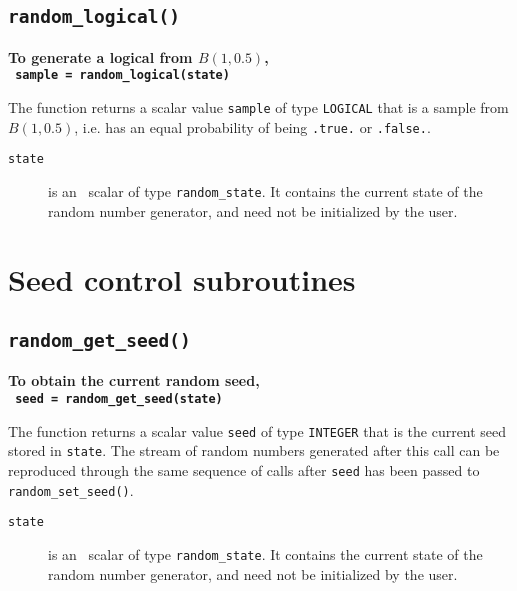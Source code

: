 \subsection{\texttt{random\_logical()}}

\textbf{\noindent
   To generate a logical from $B(1,0.5)$,
   \vspace*{0.1cm} \\
   \texttt{ \hspace*{0.2cm}
      sample = random\_logical(state)
   }
   \vspace{0.3cm}
}

\noindent
The function returns a scalar value {\tt sample} of type {\tt LOGICAL} that is a
sample from $B(1,0.5)$, i.e. has an equal probability of being {\tt .true.} or
{\tt .false.}.

\begin{description}

\item[\texttt{state}] is an \intentinout\ scalar of
type  {\tt random\_state}. It contains the current state of the random number
generator, and need not be initialized by the user.

\end{description}

\section{Seed control subroutines}

\subsection{\texttt{random\_get\_seed()}}

\textbf{\noindent
   To obtain the current random seed,
   \vspace*{0.1cm} \\
   \texttt{ \hspace*{0.2cm}
      seed = random\_get\_seed(state)
   }
   \vspace{0.3cm}
}

\noindent
The function returns a scalar value {\tt seed} of type {\tt INTEGER} that is the
current seed stored in {\tt state}. The stream of random numbers generated after
this call can be reproduced through the same sequence of calls after {\tt seed}
has been passed to {\tt random\_set\_seed()}.

\begin{description}

\item[\texttt{state}] is an \intentin\ scalar of
type  {\tt random\_state}. It contains the current state of the random number
generator, and need not be initialized by the user.

\end{description}

